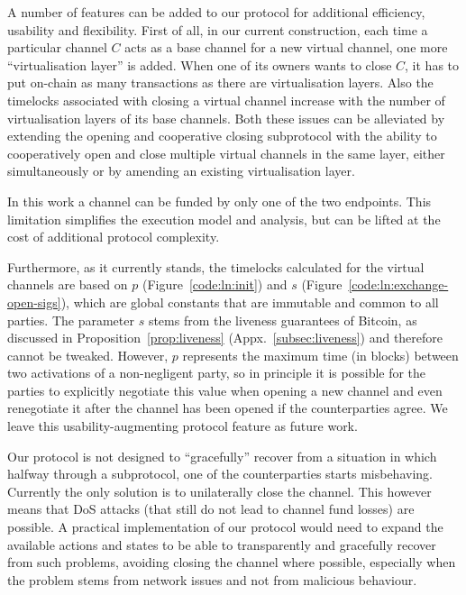   A number of features can be added to our protocol for additional efficiency,
  usability and flexibility. First of all, in our current construction, each
  time a particular channel $C$ acts as a base
  channel for a new virtual channel, one more ``virtualisation layer'' is added. When
  one of its owners wants to close $C$, it has to put on-chain as many
  transactions as there are virtualisation layers. Also the timelocks associated
  with closing a virtual channel increase with the number of virtualisation
  layers of its base channels. Both these issues can be alleviated by extending
  the opening and cooperative closing subprotocol with the ability to
  cooperatively open and close multiple virtual channels in the same layer,
  either simultaneously or by amending an existing virtualisation layer.

  In this work a channel can be funded by only one of the two endpoints.
  This limitation simplifies the execution model and analysis, but can be lifted
  at the cost of additional protocol complexity.

  Furthermore, as it currently stands, the
  timelocks calculated for the virtual channels are based on $p$
  (Figure~\ref{code:ln:init}) and $s$ (Figure~\ref{code:ln:exchange-open-sigs}),
  which are global constants that are immutable and common to all parties. The
  parameter $s$ stems from the liveness guarantees of Bitcoin, as discussed in
  Proposition~\ref{prop:liveness} (Appx.~\ref{subsec:liveness}) and therefore cannot be tweaked. However, $p$
  represents the maximum time (in blocks) between two activations of a
  non-negligent party, so in principle it is possible for the parties to
  explicitly negotiate this value when opening a new channel and even
  renegotiate it after the channel has been opened if the counterparties agree.
  We leave this usability-augmenting protocol feature as future work.

  Our protocol is not designed to ``gracefully'' recover from a situation in
  which halfway through a subprotocol, one of the counterparties starts
  misbehaving. Currently the only solution is to unilaterally close the channel.
  This however means that DoS attacks (that still do not lead to channel fund
  losses) are possible. A practical implementation of our protocol would need to
  expand the available actions and states to be able to transparently and
  gracefully recover from such problems, avoiding closing the channel where
  possible, especially when the problem stems from network issues and not from
  malicious behaviour.

